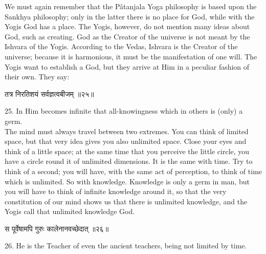 We must again remember that the Pâtanjala Yoga philosophy is
based upon the Sankhya philosophy; only in the latter there is no place
for God, while with the Yogis God has a place. The Yogis, however, do
not mention many ideas about
God, such as creating. God as the Creator of the universe is not meant
by the Ishvara of the Yogis. According to the Vedas, Ishvara is the
Creator of the universe; because it is harmonious, it must be the
manifestation of one will. The Yogis want to establish a God, but they
arrive at Him in a peculiar fashion of their own. They say: \\

\begin{center}
\begin{sanskrit}
तत्र निरतिशयं सर्वज्ञत्वबीजम् ॥२५॥
\end{sanskrit}
\end{center}
25. In Him becomes infinite that all-knowingness which in
others is (only) a germ. \\

The mind must always travel between two extremes. You can
think of limited space, but that very idea gives you also unlimited
space. Close your eyes and think of a little space; at the same time
that you perceive the little circle, you have a circle round it of
unlimited dimensions. It is the same with time. Try to think of a
second; you will have, with the same act of perception, to think of
time which is unlimited. So with knowledge. Knowledge is only a germ in
man, but you will have to think of infinite knowledge around it, so
that the very constitution of our mind shows us that there is unlimited
knowledge, and the Yogis call that unlimited knowledge God. \\

\begin{center}
\begin{sanskrit}
स पूर्वेषामपि गुरुः कालेनानवच्छेदात् ॥२६॥
\end{sanskrit}
\end{center}
26. He is the Teacher of even the ancient teachers, being not
limited by time. \\


